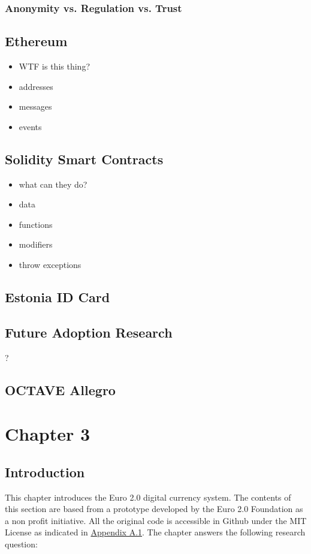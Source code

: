\documentclass[12pt]{article} %
\begin{document}
\subsubsection{Anonymity vs. Regulation vs. Trust}

\subsection{Ethereum}
\begin{itemize}
	\item WTF is this thing?
	\item addresses
	\item messages
	\item events
\end{itemize}

\subsection{Solidity Smart Contracts}
\begin{itemize}
	\item what can they do?
	\item data
	\item functions
	\item modifiers
	\item throw exceptions
\end{itemize}

\subsection{Estonia ID Card}

\subsection{Future Adoption Research}
?

\subsection{OCTAVE Allegro}

\pagebreak

\section{Chapter 3} \label{sec:3}

\subsection{Introduction} \label{ssec:3.1}
This chapter introduces the Euro 2.0 digital currency system. The contents of this section are based from a prototype developed by the Euro 2.0 Foundation as a non profit initiative. All the original code is accessible in Github under the MIT License as indicated in \hyperref[ssec:a.1]{Appendix A.1}. The chapter answers the following research question:
\end{document}

